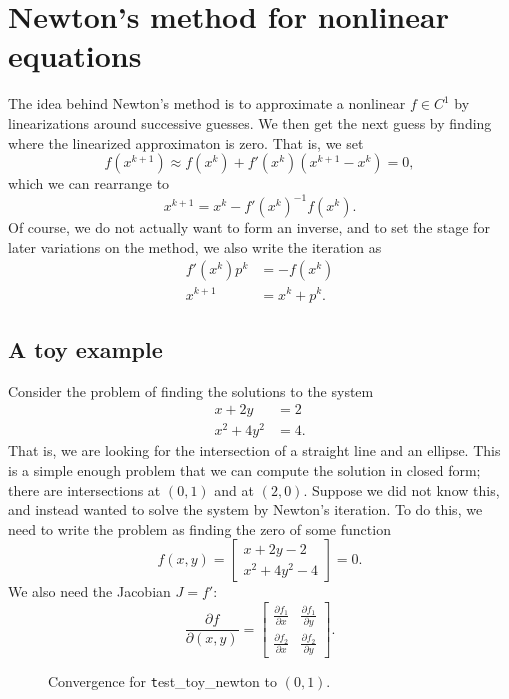 \documentclass[12pt, leqno]{article} %
\begin{document}
\section{Newton's method for nonlinear equations}

The idea behind Newton's method is to approximate a nonlinear
\(f \in C^1\) by linearizations around successive guesses. We then get
the next guess by finding where the linearized approximaton is zero.
That is, we set
\[f(x^{k+1}) \approx f(x^k) + f'(x^k) (x^{k+1}-x^k) = 0,\] which we can
rearrange to \[x^{k+1} = x^k - f'(x^k)^{-1} f(x^k).\] Of course, we do
not actually want to form an inverse, and to set the stage for later
variations on the method, we also write the iteration as \begin{align*}
f'(x^k) p^k &= -f(x^k) \\
x^{k+1} &= x^k + p^k.
\end{align*}

\subsection{A toy example}

Consider the problem of finding the solutions to the system
\begin{align*}
  x + 2y &= 2 \\
  x^2 + 4y^2 &= 4.
\end{align*} That is, we are looking for the intersection of a straight
line and an ellipse. This is a simple enough problem that we can compute
the solution in closed form; there are intersections at \((0, 1)\) and
at \((2, 0)\). Suppose we did not know this, and instead wanted to solve
the system by Newton's iteration. To do this, we need to write the
problem as finding the zero of some function
\[f(x,y) = \begin{bmatrix} x + 2y - 2 \\ x^2 + 4y^2 - 4 \end{bmatrix} = 0.\]
We also need the Jacobian \(J = f'\):
\[\frac{\partial f}{\partial (x, y)} = 
\begin{bmatrix} 
  \frac{\partial f_1}{\partial x} & \frac{\partial f_1}{\partial y} \\
  \frac{\partial f_2}{\partial x} & \frac{\partial f_2}{\partial y}
\end{bmatrix}.\]

\begin{figure}
\caption{Convergence for {\texttt test\_toy\_newton} to $(0,1)$.}
\label{fig:toy-newton-cvg}
\end{figure}
\end{document}
